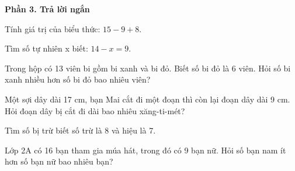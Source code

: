 \textbf{Phần 3. Trả lời ngắn}

\begin{ex} %
Tính giá trị của biểu thức: $15 - 9 + 8$.
\end{ex}

\begin{ex} %
Tìm số tự nhiên x biết: $14 - x = 9$.
\end{ex}

\begin{ex} %
Trong hộp có 13 viên bi gồm bi xanh và bi đỏ. Biết số bi đỏ là 6 viên. Hỏi số bi xanh nhiều hơn số bi đỏ bao nhiêu viên?
\end{ex}

\begin{ex} %
Một sợi dây dài 17 cm, bạn Mai cắt đi một đoạn thì còn lại đoạn dây dài 9 cm. Hỏi đoạn dây bị cắt đi dài bao nhiêu xăng-ti-mét?
\end{ex}

\begin{ex} %
Tìm số bị trừ biết số trừ là 8 và hiệu là 7.
\end{ex}

\begin{ex} %
Lớp 2A có 16 bạn tham gia múa hát, trong đó có 9 bạn nữ. Hỏi số bạn nam ít hơn số bạn nữ bao nhiêu bạn?
\end{ex}
